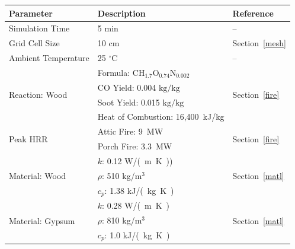 \documentclass[12pt,oneside]{book}
\renewcommand{\C}{\mbox{C}}
\renewcommand{\H}{\mbox{H}}
\renewcommand{\O}{\mbox{O}}
\newcommand{\N}{\mbox{N}}
\begin{document}
\begin{table}
\centering
{}\label{tab:mod_param}
\begin{tabular}{lll}
\toprule[1.5pt]
Parameter & Description & Reference  \\
\midrule
 Simulation Time                   &  5 min                                                        & -- \\[.25cm]
 Grid Cell Size                    &  10 cm                                                        & Section~\ref{mesh} \\ [.25cm]
 Ambient Temperature               &  25 $^{\circ}$C                                               & -- \\ [.1cm]
\multirow{4}{*}{Reaction: Wood}    &  Formula: $\C\H_{1.7}\O_{0.74}\N_{0.002}$                     & \multirow{4}{*}{Section~\ref{fire}} \\
                                   &  CO Yield: 0.004 \; $\mathrm{kg}/\mathrm{kg}$   & \\
                                   &  Soot Yield: 0.015 \; $\mathrm{kg}/\mathrm{kg}$  & \\
                                   &  Heat of Combustion: 16,400~kJ/kg                             & \\ [.25cm]
\multirow{2}{*}{Peak HRR}          &  Attic Fire: 9~MW                                             & \multirow{2}{*}{Section~\ref{fire}}\\ 
                                   &  Porch Fire: 3.3~MW                                           & \\ [.25cm]                     
\multirow{3}{*}{Material: Wood}    &  $k$: 0.12 \; \si{W/(m.K)})                                   & \multirow{3}{*}{Section~\ref{matl}} \\
                                   &  $\rho$: 510 \; kg/m$^3$                                      & \\
                                   &  $c_{p}$: 1.38 \; \si{kJ/(kg.K)}                              & \\[.25cm]
\multirow{3}{*}{Material: Gypsum}  &  $k$: 0.28 \; \si{W/(m.K)}                                    &  \multirow{3}{*}{Section~\ref{matl}}\\ 
                                   &  $\rho$: 810 \; kg/m$^3$                                      & \\ 
                                   &  $c_{p}$: 1.0 \; \si{kJ/(kg.K)}                               & \\
\bottomrule[1.25pt]
\end{tabular}\par
\end{table}
\end{document}
